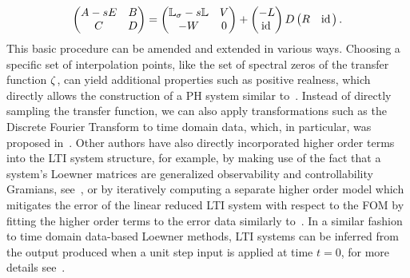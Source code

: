 \begin{equation}\label{eq:loewner-realization}
    \begin{pmatrix}
        A - sE & B \\
        C & D
    \end{pmatrix} = \begin{pmatrix}
        \mathbb{L}_\sigma - s \mathbb{L} & V \\
        -W & 0
    \end{pmatrix} + \begin{pmatrix}
        -L \\
        \text{id}_{\mkern2mu }
    \end{pmatrix} D \begin{pmatrix}
        R & \text{id}_{\mkern2mu }
    \end{pmatrix}.
\end{equation}
This basic procedure can be amended and extended in various ways.
Choosing a specific set of interpolation points, like the set of spectral zeros of the transfer function $\zeta$, can yield additional properties such as positive realness, which directly allows the construction of a \ac{PH} system similar to~\cite{BGD2020, Poussot2023}.
Instead of directly sampling the transfer function, we can also apply transformations such as the Discrete Fourier Transform to time domain data, which, in particular, was proposed in~\cite{Peherstorfer2017, Cherifi2021}.
Other authors have also directly incorporated higher order terms into the \ac{LTI} system structure, for example, by making use of the fact that a system's Loewner matrices are generalized observability and controllability Gramians, see~\cite{Antoulas2019}, or by iteratively computing a separate higher order model which mitigates the error of the linear reduced \ac{LTI} system with respect to the \ac{FOM} by fitting the higher order terms to the error data similarly to~\cite{GKA2021}.
In a similar fashion to time domain data-based Loewner methods, \ac{LTI} systems can be inferred from the output produced when a unit step input is applied at time $t = 0$, for more details see~\cite{Miller2012}.

